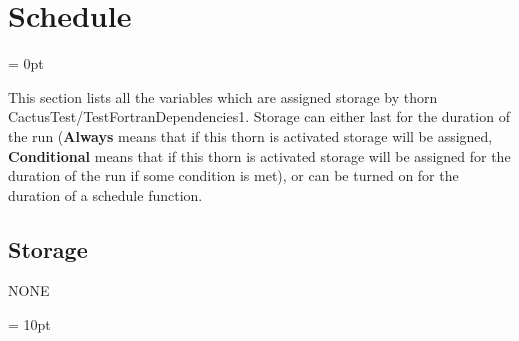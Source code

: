 
\section{Schedule} 


\parskip = 0pt


\noindent This section lists all the variables which are assigned storage by thorn CactusTest/TestFortranDependencies1.  Storage can either last for the duration of the run ({\bf Always} means that if this thorn is activated storage will be assigned, {\bf Conditional} means that if this thorn is activated storage will be assigned for the duration of the run if some condition is met), or can be turned on for the duration of a schedule function.


\subsection*{Storage}NONE

\vspace{5mm}\parskip = 10pt 

